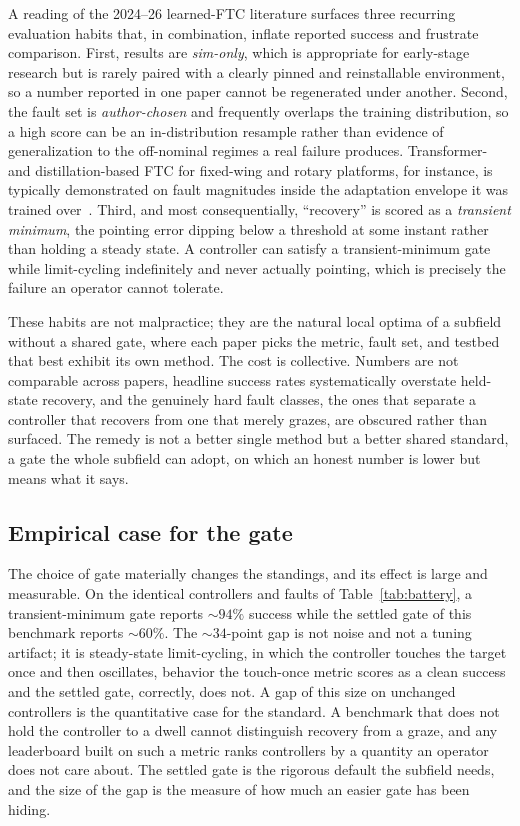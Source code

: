 \documentclass[11pt]{article}
\begin{document}
A reading of the 2024--26 learned-FTC literature surfaces three recurring evaluation habits that, in
combination, inflate reported success and frustrate comparison. First, results are
\emph{sim-only}, which is appropriate for early-stage research but is rarely paired with a clearly
pinned and reinstallable environment, so a number reported in one paper cannot be regenerated under
another. Second, the fault set is \emph{author-chosen} and frequently overlaps the training
distribution, so a high score can be an in-distribution resample rather than evidence of
generalization to the off-nominal regimes a real failure produces. Transformer- and
distillation-based FTC for fixed-wing and rotary platforms, for instance, is typically demonstrated
on fault magnitudes inside the adaptation envelope it was trained over~\cite{Giral2024,Kim2025}.
Third, and most consequentially, ``recovery'' is scored as a \emph{transient minimum}, the pointing
error dipping below a threshold at some instant rather than holding a steady state. A controller can
satisfy a transient-minimum gate while limit-cycling indefinitely and never actually pointing, which
is precisely the failure an operator cannot tolerate.

These habits are not malpractice; they are the natural local optima of a subfield without a shared
gate, where each paper picks the metric, fault set, and testbed that best exhibit its own method. The
cost is collective. Numbers are not comparable across papers, headline success rates systematically
overstate held-state recovery, and the genuinely hard fault classes, the ones that separate a
controller that recovers from one that merely grazes, are obscured rather than surfaced. The remedy
is not a better single method but a better shared standard, a gate the whole subfield can adopt, on
which an honest number is lower but means what it says.

\subsection{Empirical case for the gate} The choice of gate materially changes the standings, and its effect
is large and measurable. On the identical controllers and faults of Table~\ref{tab:battery}, a
transient-minimum gate reports $\sim$$94\%$ success while the settled gate of this benchmark reports
$\sim$$60\%$. The $\sim$$34$-point gap is not noise and not a tuning artifact; it is steady-state
limit-cycling, in which the controller touches the target once and then oscillates, behavior the
touch-once metric scores as a clean success and the settled gate, correctly, does not. A gap of this
size on unchanged controllers is the quantitative case for the standard. A benchmark that does not
hold the controller to a dwell cannot distinguish recovery from a graze, and any leaderboard built on
such a metric ranks controllers by a quantity an operator does not care about. The settled gate is
the rigorous default the subfield needs, and the size of the gap is the measure of how much an easier
gate has been hiding.
\end{document}
